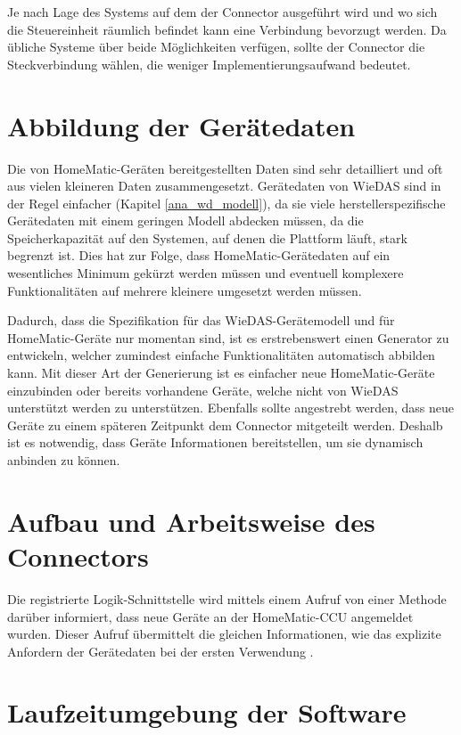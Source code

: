 Je nach Lage des Systems auf dem der Connector ausgeführt wird und wo sich die Steuereinheit räumlich
befindet kann eine Verbindung bevorzugt werden.
Da übliche Systeme über beide Möglichkeiten verfügen, sollte der Connector die Steckverbindung wählen,
die weniger Implementierungsaufwand bedeutet.

\section{Abbildung der Gerätedaten}
\label{ana_abb}

Die von HomeMatic-Geräten bereitgestellten Daten sind sehr detailliert und oft aus vielen kleineren
Daten zusammengesetzt.
Gerätedaten von WieDAS sind in der Regel einfacher (Kapitel \ref{ana_wd_modell}), da sie viele
herstellerspezifische Gerätedaten mit einem geringen Modell abdecken müssen, da die Speicherkapazität
auf den Systemen, auf denen die Plattform läuft, stark begrenzt ist.
Dies hat zur Folge, dass HomeMatic-Gerätedaten auf ein wesentliches Minimum gekürzt werden müssen und
eventuell komplexere Funktionalitäten auf mehrere kleinere umgesetzt werden müssen.

Dadurch, dass die Spezifikation für das WieDAS-Gerätemodell und für HomeMatic-Geräte nur momentan sind,
ist es erstrebenswert einen Generator zu entwickeln, welcher zumindest einfache Funktionalitäten
automatisch abbilden kann.
Mit dieser Art der Generierung ist es einfacher neue HomeMatic-Geräte einzubinden oder bereits vorhandene
Geräte, welche nicht von WieDAS unterstützt werden zu unterstützen.
Ebenfalls sollte angestrebt werden, dass neue Geräte zu einem späteren Zeitpunkt dem Connector mitgeteilt
werden.
Deshalb ist es notwendig, dass Geräte Informationen bereitstellen, um sie dynamisch anbinden zu können.


\section{Aufbau und Arbeitsweise des Connectors}
\label{ana_connector}

Die registrierte Logik-Schnittstelle wird mittels einem Aufruf von einer Methode darüber
informiert, dass neue Geräte an der HomeMatic-CCU angemeldet wurden.
Dieser Aufruf übermittelt die gleichen Informationen, wie das explizite Anfordern
der Gerätedaten bei der ersten Verwendung \cite{homematic_xmlrpc}.

\section{Laufzeitumgebung der Software}
\label{ana_laufzeitumgebung}

